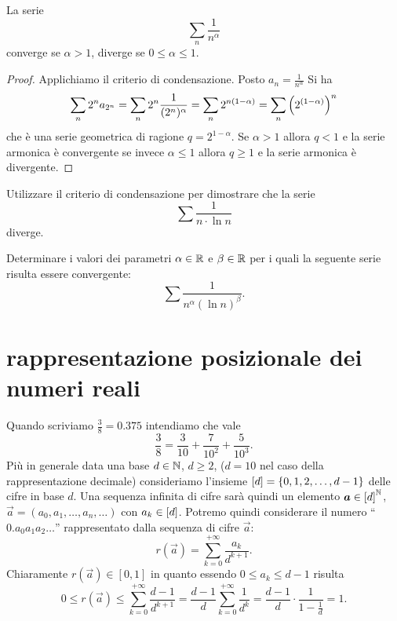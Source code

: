 \begin{corollary}
\mymark{***}
%
La serie
\[
 \sum_n \frac{1}{n^\alpha}
\]
converge se $\alpha>1$,
diverge se $0\le \alpha\le 1$.
\end{corollary}
%
\begin{proof}
\mymark{***}
Applichiamo il criterio di condensazione. Posto $a_n = \frac 1{n^\alpha}$ Si ha
\[
  \sum_n 2^n a_{2^n} = \sum_n 2^n \frac{1}{(2^n)^\alpha}
  = \sum_n 2^{n(1-\alpha)}
  = \sum_n {\left( 2^{(1-\alpha)} \right)}^n
\]
che è una serie geometrica di ragione $q=2^{1-\alpha}$.
Se $\alpha>1$ allora $q<1$ e la serie armonica è convergente
se invece $\alpha \le 1$ allora $q\ge 1$ e la serie
armonica è divergente.
\end{proof}

\begin{exercise}
Utilizzare il criterio di condensazione per dimostrare che la serie
\[
  \sum \frac{1}{n \cdot \ln n}
\]
diverge.
\end{exercise}

\begin{exercise}
  Determinare i valori dei parametri $\alpha\in {\mathbb R}$ e $\beta\in {\mathbb R}$
  per i quali la seguente serie risulta essere convergente:
  \[
    \sum \frac{1}{n^\alpha (\ln n)^\beta}.
  \]
\end{exercise}

\section{rappresentazione posizionale dei numeri reali}
Quando scriviamo $\frac{3}{8} = 0.375$ intendiamo che vale 
\[
\frac 3 8 = \frac{3}{10} + \frac{7}{10^2} + \frac{5}{10^3}.  
\]
Più in generale data una base $d\in {\mathbb N}$, $d\ge 2$, ($d=10$ nel 
caso della rappresentazione decimale)
consideriamo l'insieme ${\left[ d \right]} = {\left\{ 0,1,2,\dots, d-1 \right\}}$ 
delle cifre in base $d$.
Una sequenza infinita di cifre sarà quindi un elemento 
$\boldsymbol a \in {\left[ d \right]}^{\mathbb N}$, $\vec a = (a_0,a_1,\dots, a_n, \dots)$
con $a_k\in {\left[ d \right]}$.
Potremo quindi considerare il numero ``$0.a_0 a_1 a_2 \ldots$'' rappresentato 
dalla sequenza di cifre $\vec a$:
\[
  r(\vec a) = \sum_{k=0}^{+\infty} \frac{a_k}{d^{k+1}}.
\]
Chiaramente $r(\vec a)\in [0,1]$ in quanto essendo $0\le a_k\le d-1$ 
risulta
\begin{equation}\label{eq:10445934}
 0 \le r(\vec a) \le \sum_{k=0}^{+\infty} \frac{d-1}{d^{k+1}}
  = \frac{d-1}{d}\sum_{k=0}^{+\infty}\frac 1 {d^k}
  = \frac{d-1}{d}\cdot \frac{1}{1-\frac 1 d} = 1.
\end{equation}

